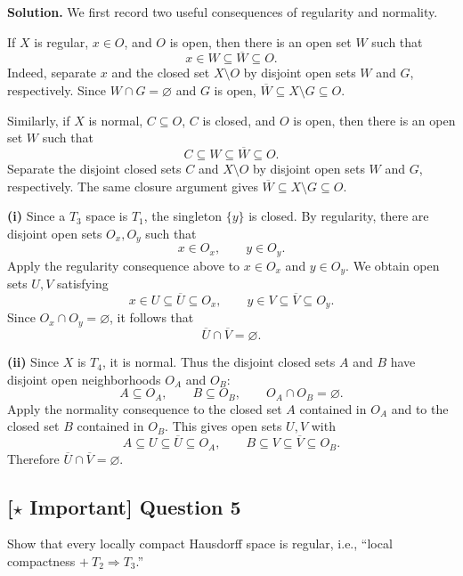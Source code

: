 \documentclass{article}
\newcommand{\important}{\texorpdfstring{\textbf{[\(\star\) Important]}}{[Important]}}
\newenvironment{solution}{\par\noindent\textbf{Solution.}\quad}{\par}
\begin{document}
\begin{solution}
  We first record two useful consequences of regularity and normality.

  If $X$ is regular, $x\in O$, and $O$ is open, then there is an open set
  $W$ such that
  \[
    x\in W\subseteq\overline{W}\subseteq O.
  \]
  Indeed, separate $x$ and the closed set $X\setminus O$ by disjoint open
  sets $W$ and $G$, respectively. Since $W\cap G=\varnothing$ and $G$ is
  open, $\overline{W}\subseteq X\setminus G\subseteq O$.

  Similarly, if $X$ is normal, $C\subseteq O$, $C$ is closed, and $O$ is
  open, then there is an open set $W$ such that
  \[
    C\subseteq W\subseteq\overline{W}\subseteq O.
  \]
  Separate the disjoint closed sets $C$ and $X\setminus O$ by disjoint open
  sets $W$ and $G$, respectively. The same closure argument gives
  $\overline{W}\subseteq X\setminus G\subseteq O$.

  \textbf{(i)} Since a $T_3$ space is $T_1$, the singleton $\{y\}$ is
  closed. By regularity, there are disjoint open sets $O_x,O_y$ such that
  \[
    x\in O_x,\qquad y\in O_y.
  \]
  Apply the regularity consequence above to $x\in O_x$ and $y\in O_y$.
  We obtain open sets $U,V$ satisfying
  \[
    x\in U\subseteq\overline{U}\subseteq O_x,
    \qquad
    y\in V\subseteq\overline{V}\subseteq O_y.
  \]
  Since $O_x\cap O_y=\varnothing$, it follows that
  \[
    \overline{U}\cap\overline{V}=\varnothing.
  \]

  \textbf{(ii)} Since $X$ is $T_4$, it is normal. Thus the disjoint closed
  sets $A$ and $B$ have disjoint open neighborhoods $O_A$ and $O_B$:
  \[
    A\subseteq O_A,\qquad B\subseteq O_B,\qquad O_A\cap O_B=\varnothing.
  \]
  Apply the normality consequence to the closed set $A$ contained in $O_A$
  and to the closed set $B$ contained in $O_B$. This gives open sets $U,V$
  with
  \[
    A\subseteq U\subseteq\overline{U}\subseteq O_A,
    \qquad
    B\subseteq V\subseteq\overline{V}\subseteq O_B.
  \]
  Therefore $\overline{U}\cap\overline{V}=\varnothing$.
\end{solution}

\subsection{\important{} Question 5}

Show that every locally compact Hausdorff space is regular, i.e.,
``local compactness $+\ T_2\Rightarrow T_3$.''
\end{document}
